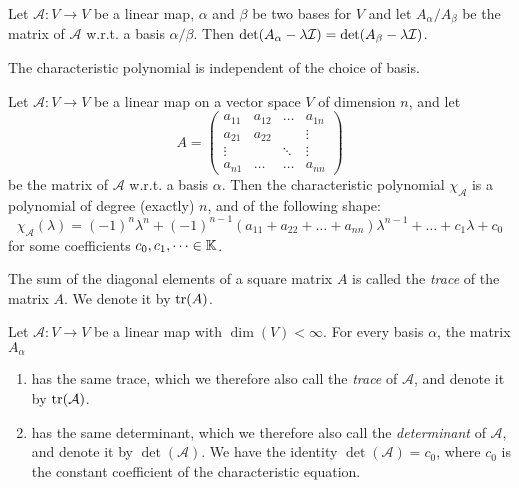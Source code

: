 \begin{theorem}
    Let $\mathcal{A}: V \to V$ be a linear map, $\alpha$ and $\beta$ be two bases for $V$ and let $A_\alpha/A_\beta$ be the matrix of $\mathcal{A}$ w.r.t. a basis $\alpha/\beta$.
    Then $\det(A_\alpha - \lambda \mathcal{I}) = \det(A_\beta - \lambda \mathcal{I})$.
\end{theorem}

\begin{remark}
    The characteristic polynomial is independent of the choice of basis.
\end{remark}

\begin{theorem}
    Let $\mathcal{A}: V \to V$ be a linear map on a vector space $V$ of dimension $n$, and let
    $$A = \begin{pmatrix} a_{11} & a_{12} & \dots & a_{1n} \\
                          a_{21} & a_{22} &       & \vdots \\
                          \vdots &        & \ddots & \vdots \\ a_{n1} & \dots & \dots & a_{nn} \end{pmatrix}$$
    be the matrix of $\mathcal{A}$ w.r.t. a basis $\alpha$. Then the characteristic polynomial $\chi_\mathcal{A}$ is a polynomial of degree (exactly) $n$, and of the following shape:
    $$\chi_\mathcal{A}(\lambda) = (-1)^n\lambda^n + (-1)^{n-1}(a_{11}+a_{22}+\dots+a_{nn})\lambda^{n-1} + \dots + c_1\lambda + c_0$$
    for some coefficients $c_0, c_1, \dots \in \mathbb{K}$.
\end{theorem}

\begin{definition}[Trace]
    The sum of the diagonal elements of a square matrix $A$ is called the \emph{trace} of the matrix $A$. We denote it by $\tr(A)$.
\end{definition}

\begin{theorem}
    Let $\mathcal{A}: V \to V$ be a linear map with $\dim(V) < \infty$. For every basis $\alpha$, the matrix $A_\alpha$
    \begin{enumerate}
        \item has the same trace, which we therefore also call the \emph{trace}  of $\mathcal{A}$, and denote it by $\tr(\mathcal{A})$.
        \item has the same determinant, which we therefore also call the \emph{determinant} of $\mathcal{A}$, and denote it by $\det(\mathcal{A})$. We have the identity $\det(\mathcal{A}) = c_0$,
            where $c_0$ is the constant coefficient of the characteristic equation.
    \end{enumerate}
\end{theorem}

